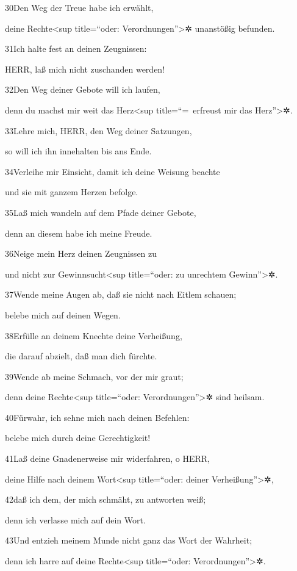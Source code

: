 30Den Weg der Treue habe ich erwählt,

deine Rechte\textless sup title=``oder: Verordnungen''\textgreater✲
unanstößig befunden.

31Ich halte fest an deinen Zeugnissen:

HERR, laß mich nicht zuschanden werden!

32Den Weg deiner Gebote will ich laufen,

denn du machst mir weit das Herz\textless sup title=``=~erfreust mir das
Herz''\textgreater✲.

33Lehre mich, HERR, den Weg deiner Satzungen,

so will ich ihn innehalten bis ans Ende.

34Verleihe mir Einsicht, damit ich deine Weisung beachte

und sie mit ganzem Herzen befolge.

35Laß mich wandeln auf dem Pfade deiner Gebote,

denn an diesem habe ich meine Freude.

36Neige mein Herz deinen Zeugnissen zu

und nicht zur Gewinnsucht\textless sup title=``oder: zu unrechtem
Gewinn''\textgreater✲.

37Wende meine Augen ab, daß sie nicht nach Eitlem schauen;

belebe mich auf deinen Wegen.

38Erfülle an deinem Knechte deine Verheißung,

die darauf abzielt, daß man dich fürchte.

39Wende ab meine Schmach, vor der mir graut;

denn deine Rechte\textless sup title=``oder: Verordnungen''\textgreater✲
sind heilsam.

40Fürwahr, ich sehne mich nach deinen Befehlen:

belebe mich durch deine Gerechtigkeit!

41Laß deine Gnadenerweise mir widerfahren, o HERR,

deine Hilfe nach deinem Wort\textless sup title=``oder: deiner
Verheißung''\textgreater✲,

42daß ich dem, der mich schmäht, zu antworten weiß;

denn ich verlasse mich auf dein Wort.

43Und entzieh meinem Munde nicht ganz das Wort der Wahrheit;

denn ich harre auf deine Rechte\textless sup title=``oder:
Verordnungen''\textgreater✲.

